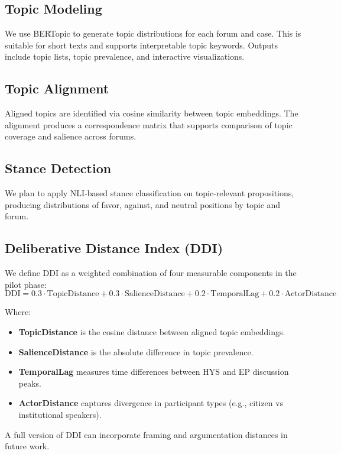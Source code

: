 \documentclass[11pt,a4paper]{article}
\begin{document}
\subsection{Topic Modeling}
We use BERTopic to generate topic distributions for each forum and case. This is suitable for short texts and supports interpretable topic keywords. Outputs include topic lists, topic prevalence, and interactive visualizations.

\subsection{Topic Alignment}
Aligned topics are identified via cosine similarity between topic embeddings. The alignment produces a correspondence matrix that supports comparison of topic coverage and salience across forums.

\subsection{Stance Detection}
We plan to apply NLI-based stance classification on topic-relevant propositions, producing distributions of favor, against, and neutral positions by topic and forum.

\subsection{Deliberative Distance Index (DDI)}
We define DDI as a weighted combination of four measurable components in the pilot phase:
\begin{equation}
\text{DDI} = 0.3 \cdot \text{TopicDistance} + 0.3 \cdot \text{SalienceDistance} + 0.2 \cdot \text{TemporalLag} + 0.2 \cdot \text{ActorDistance}
\end{equation}

Where:
\begin{itemize}
  \item \textbf{TopicDistance} is the cosine distance between aligned topic embeddings.
  \item \textbf{SalienceDistance} is the absolute difference in topic prevalence.
  \item \textbf{TemporalLag} measures time differences between HYS and EP discussion peaks.
  \item \textbf{ActorDistance} captures divergence in participant types (e.g., citizen vs institutional speakers).
\end{itemize}

A full version of DDI can incorporate framing and argumentation distances in future work.
\end{document}
